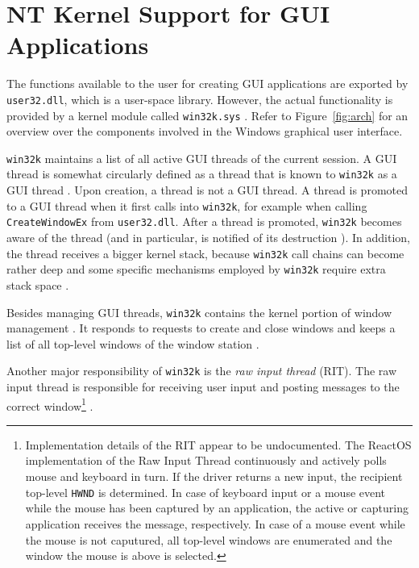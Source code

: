	\section{NT Kernel Support for GUI Applications}\label{sec:win32k}
		The functions available to the user for creating GUI applications are
		exported by \texttt{user32.dll}, which is a user-space library.
		However, the actual functionality is provided by a kernel module called
		\texttt{win32k.sys} \cite{probertwin32k}. Refer to Figure~\ref{fig:arch} for an overview over the
		components involved in the Windows graphical user interface.

		\texttt{win32k} maintains a list of all active GUI threads of the
		current session. A GUI thread is somewhat circularly defined as a
		thread that is known to \texttt{win32k} as a GUI thread \cite{probertwin32k}. Upon creation,
		a thread is not a GUI thread. A thread is promoted to a GUI thread when
		it first calls into \texttt{win32k}, for example when calling
		\texttt{CreateWindowEx} from \texttt{user32.dll}. After a thread is
		promoted, \texttt{win32k} becomes aware of the thread (and in
		particular, is notified of its destruction \cite{probertwin32k}). In addition, the thread
		receives a bigger kernel stack, because \texttt{win32k} call chains
		can become rather deep and some specific mechanisms employed by \texttt{win32k}
		require extra stack space \cite{mandy2011kernel}.

		Besides managing GUI threads, \texttt{win32k} contains the kernel portion
		of window management \cite{probertwin32k}. It responds to requests to create and close windows
		and keeps a list of all top-level windows of the window station \cite{goingdeep}.

		Another major responsibility of \texttt{win32k} is the \textit{raw input
		thread} (RIT). The raw input thread is responsible for receiving user input and posting
		messages to the correct window\footnote{Implementation details of the
		RIT appear to be undocumented. The ReactOS implementation of
		the Raw Input Thread continuously and actively polls mouse and keyboard
		in turn. If the driver returns a new input, the recipient top-level \texttt{HWND}
		is determined. In case of keyboard input or a mouse event while the mouse
		has been captured by an application, the active or capturing application
		receives the message, respectively. In case of a mouse event while the
		mouse is not caputured, all top-level windows are enumerated and the
		window the mouse is above is selected.} \cite{probertwin32k}.

